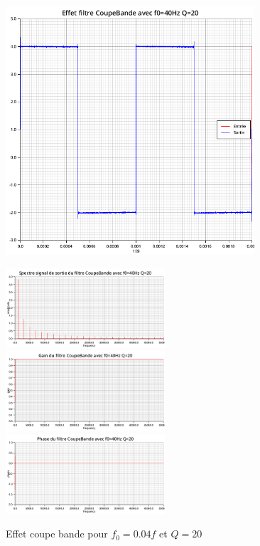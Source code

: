 \documentclass{article}
\begin{document}
\begin{figure}[H]
  \begin{minipage}{0.6\textwidth}
      \centering
      \includegraphics[width=25em]{images/creneau/rejecteur/q=20/0.04/signals.png}
  \end{minipage}
  \begin{minipage}{0.3\textwidth}
      \centering
      \includegraphics[width=16em]{images/creneau/rejecteur/q=20/0.04/fft_out.png}
      \vfill
      \includegraphics[width=16em]{images/creneau/rejecteur/q=20/0.04/gain.png}
      \vfill
      \includegraphics[width=16em]{images/creneau/rejecteur/q=20/0.04/phase.png}
  \end{minipage}
  \caption{Effet coupe bande pour $f_0=0.04f$ et $Q=20$}
\end{figure}
\end{document}
